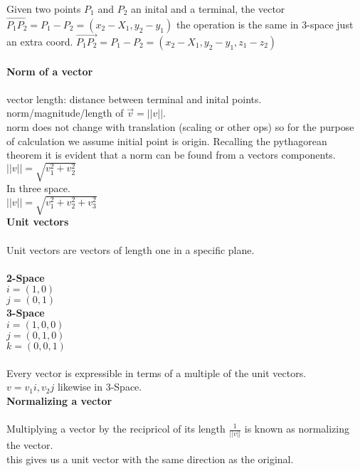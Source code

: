 \documentclass[14pt]{extreport}
\begin{document}
Given two points $P_1$ and $P_2$ an inital and a terminal, the vector $\vec{P_1 P_2} = P_1 - P_2 = (x_2 - X_1, y_2 - y_1)$ the operation is the same in 3-space just an extra coord. $\vec{P_1 P_2} = P_1 - P_2 = (x_2 - X_1, y_2 - y_1, z_1 - z_2)$\\\\

\textbf{Norm of a vector}\\\\
vector length: distance between terminal and inital points.\\
norm/magnitude/length of $\vec{v} = ||v||$.\\

norm does not change with translation (scaling or other ops) so for the purpose of calculation we assume initial point is origin. Recalling the pythagorean theorem it is evident that a norm can be found from a vectors components.\\

$||v|| = \sqrt{v_1^{2} + v_2^{2}}$\\

In three space.\\
$||v|| = \sqrt{v_1^{2} + v_2^{2} +v_3^{2}}$\\

\textbf{Unit vectors}\\\\
Unit vectors are vectors of length one in a specific plane.\\\\

\textbf{2-Space}\\
$i = (1, 0)$\\
$j = (0,1)$\\

\textbf{3-Space}\\
$i = (1, 0, 0)$\\
$j = (0,1, 0)$\\
$k = (0, 0, 1)$\\\\

Every vector is expressible in terms of a multiple of the unit vectors.\\

$v = v_1i, v_2j$ likewise in 3-Space.\\

\textbf{Normalizing a vector}\\\\

Multiplying a vector by the recipricol of its length $\frac{1}{||v||}$ is known as normalizing the vector.\\
this gives us a unit vector with the same direction as the original.\\\\
\end{document}
